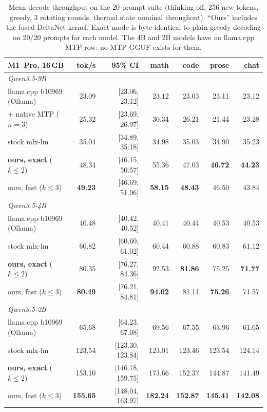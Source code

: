 \documentclass[11pt]{article}
\begin{document}
\begin{table}[t]\centering\small
\begin{tabular}{lrrrrrr}\toprule
M1~Pro, 16\,GB & tok/s & 95\% CI & math & code & prose & chat\\\midrule
\multicolumn{7}{l}{\emph{Qwen3.5-9B}}\\
llama.cpp b10969 (Ollama) & 23.09 & [23.06, 23.12] & 23.12 & 23.03 & 23.11 & 23.12\\
\quad + native MTP ($n{=}3$) & 25.32 & [23.69, 26.97] & 30.34 & 26.21 & 21.44 & 23.28\\
stock mlx-lm & 35.04 & [34.89, 35.18] & 34.98 & 35.03 & 34.90 & 35.23\\
\textbf{ours, exact} ($k{\le}2$) & 48.34 & [46.15, 50.57] & 55.36 & 47.03 & \textbf{46.72} & \textbf{44.23}\\
ours, fast ($k{\le}3$) & \textbf{49.23} & [46.69, 51.96] & \textbf{58.15} & \textbf{48.43} & 46.50 & 43.84\\
\midrule\multicolumn{7}{l}{\emph{Qwen3.5-4B}}\\
llama.cpp b10969 (Ollama) & 40.48 & [40.42, 40.52] & 40.41 & 40.44 & 40.53 & 40.53\\
stock mlx-lm & 60.82 & [60.60, 61.02] & 60.44 & 60.88 & 60.83 & 61.12\\
\textbf{ours, exact} ($k{\le}2$) & 80.35 & [76.27, 84.36] & 92.53 & \textbf{81.86} & 75.25 & \textbf{71.77}\\
ours, fast ($k{\le}3$) & \textbf{80.49} & [76.21, 84.81] & \textbf{94.02} & 81.11 & \textbf{75.26} & 71.57\\
\midrule\multicolumn{7}{l}{\emph{Qwen3.5-2B}}\\
llama.cpp b10969 (Ollama) & 65.68 & [64.23, 67.08] & 69.56 & 67.55 & 63.96 & 61.65\\
stock mlx-lm & 123.54 & [123.30, 123.84] & 123.01 & 123.46 & 123.54 & 124.14\\
\textbf{ours, exact} ($k{\le}2$) & 153.10 & [146.78, 159.75] & 173.66 & 152.37 & 144.87 & 141.49\\
ours, fast ($k{\le}3$) & \textbf{155.65} & [148.04, 163.97] & \textbf{182.24} & \textbf{152.87} & \textbf{145.41} & \textbf{142.08}\\\bottomrule
\end{tabular}
\caption{Mean decode throughput on the 20-prompt suite (thinking off, 256 new tokens, greedy, 3 rotating rounds, thermal state nominal throughout). ``Ours'' includes the fused DeltaNet kernel. Exact mode is byte-identical to plain greedy decoding on 20/20 prompts for each model. The 4B and 2B models have no llama.cpp MTP row: no MTP GGUF exists for them.}
\label{tab:main}
\end{table}
\end{document}

